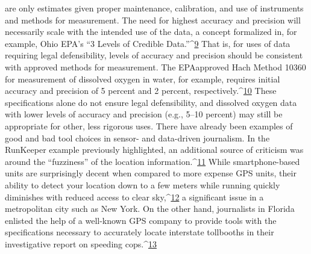 are only estimates given proper maintenance, calibration, and use of instruments
and methods for measurement. The need for highest accuracy and
precision will necessarily scale with the intended use of the data, a concept formalized in, for example, Ohio EPA's ``3 Levels of Credible Data.''^{\href{#endnotes-stauffer}{9}} That is,
for uses of data requiring legal defensibility, levels of accuracy and precision
should be consistent with approved methods for measurement. The EPAapproved
Hach Method 10360 for measurement of dissolved oxygen in
water, for example, requires initial accuracy and precision of 5 percent and
2 percent, respectively.^{\href{#endnotes-stauffer}{10}} These specifications alone do not ensure legal
defensibility, and dissolved oxygen data with lower levels of accuracy and
precision (e.g., 5–10 percent) may still be appropriate for other, less
rigorous uses.
There have already been examples of good and bad tool choices in sensor-
and data-driven journalism. In the RunKeeper example previously
highlighted, an additional source of criticism was around the ``fuzziness'' of
the location information.^{\href{#endnotes-stauffer}{11}} While smartphone-based units are surprisingly
decent when compared to more expense GPS units, their ability to detect
your location down to a few meters while running quickly diminishes with
reduced access to clear sky,^{\href{#endnotes-stauffer}{12}} a significant issue in a metropolitan city such
as New York. On the other hand, journalists in Florida enlisted the help of
a well-known GPS company to provide tools with the specifications necessary
to accurately locate interstate tollbooths in their investigative report on
speeding cops.^{\href{#endnotes-stauffer}{13}}

